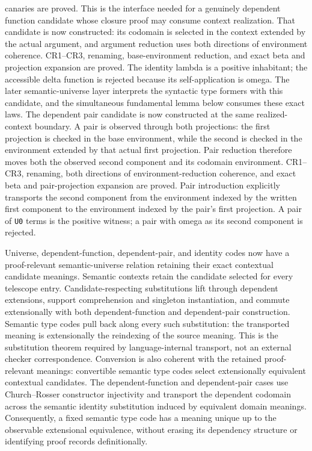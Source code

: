 \documentclass[11pt]{article}
\newcommand{\code}[1]{\texttt{#1}}
\begin{document}
canaries are proved.  This is the interface needed for a genuinely dependent
function candidate whose closure proof may consume context realization.
That candidate is now constructed: its codomain is selected in the context
extended by the actual argument, and argument reduction uses both directions
of environment coherence.  CR1--CR3, renaming, base-environment reduction,
and exact beta and projection expansion are proved.  The identity lambda is a
positive inhabitant; the accessible delta function is rejected because its
self-application is omega.  The later semantic-universe layer interprets
the syntactic type formers with this candidate, and the simultaneous fundamental
lemma below consumes these exact laws.
The dependent pair candidate is now constructed at the same realized-context
boundary.  A pair is observed through both projections: the first projection is
checked in the base environment, while the second is checked in the environment
extended by that actual first projection.  Pair reduction therefore moves both
the observed second component and its codomain environment.  CR1--CR3,
renaming, both directions of environment-reduction coherence, and exact beta
and pair-projection expansion are proved.  Pair introduction explicitly
transports the second component from the environment indexed by the written
first component to the environment indexed by the pair's first projection.  A
pair of \code{U0} terms is the positive witness; a pair with omega as its second
component is rejected.

Universe, dependent-function, dependent-pair, and identity codes now have a
proof-relevant semantic-universe relation retaining their exact contextual
candidate meanings.  Semantic contexts retain the candidate selected for every
telescope entry.  Candidate-respecting substitutions lift through dependent
extensions, support comprehension and singleton instantiation, and commute
extensionally with both dependent-function and dependent-pair construction.
Semantic type codes pull back along every such substitution: the transported
meaning is extensionally the reindexing of the source meaning.  This is the
substitution theorem required by language-internal transport, not an external
checker correspondence.  Conversion is also coherent with the retained
proof-relevant meanings: convertible semantic type codes select extensionally
equivalent contextual candidates.  The dependent-function and dependent-pair
cases use Church--Rosser constructor injectivity and transport the dependent
codomain across the semantic identity substitution induced by equivalent domain
meanings.  Consequently, a fixed semantic type code has a meaning unique up to
the observable extensional equivalence, without erasing its dependency
structure or identifying proof records definitionally.
\end{document}
